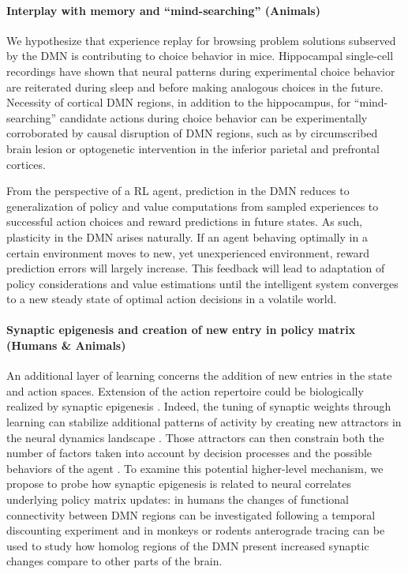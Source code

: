 \documentclass[10pt,letterpaper]{article}
\begin{document}
\paragraph*{Interplay with memory and “mind-searching” (Animals)} We hypothesize that experience replay for browsing problem solutions subserved by the DMN is contributing to choice behavior in mice. Hippocampal single-cell recordings have shown that neural patterns during experimental choice behavior are reiterated during sleep and before making analogous choices in the future. Necessity of cortical DMN regions, in addition to the hippocampus, for “mind-searching” candidate actions during choice behavior can be experimentally corroborated by causal disruption of DMN regions, such as by circumscribed brain lesion or optogenetic intervention in the inferior parietal and prefrontal cortices.







From the perspective of a RL agent,
prediction in the DMN reduces to
generalization of
policy and value computations from sampled experiences to
successful action choices and reward predictions in future states.
As such,
plasticity in the DMN arises naturally.
If an agent behaving optimally in a certain environment moves
to new, yet unexperienced environment, reward prediction errors will
largely increase.
This feedback will lead to adaptation of policy considerations
and value estimations until the intelligent system converges to a
new steady state of optimal action decisions in a volatile world.

\paragraph*{Synaptic epigenesis and creation of new entry in policy matrix (Humans \& Animals)} An additional layer of learning concerns the addition of new entries in the state and action spaces. Extension of the action repertoire could be biologically realized by synaptic epigenesis \citep{gisiger_acquisition_2005}. Indeed, the tuning of synaptic weights through learning can stabilize additional patterns of activity by creating new attractors in the neural dynamics landscape \citep{takeuchi_synaptic_2014}. Those attractors can then constrain both the number of factors taken into account by decision processes and the possible behaviors of the agent \citep{wang_decision_2008}. To examine this potential higher-level mechanism, we propose to probe how synaptic epigenesis is related to neural correlates underlying policy matrix updates: in humans the changes of functional connectivity between DMN regions can be investigated following a temporal discounting experiment and in monkeys or rodents anterograde tracing can be used to study how homolog regions of the DMN present increased synaptic changes compare to other parts of the brain.
\end{document}
